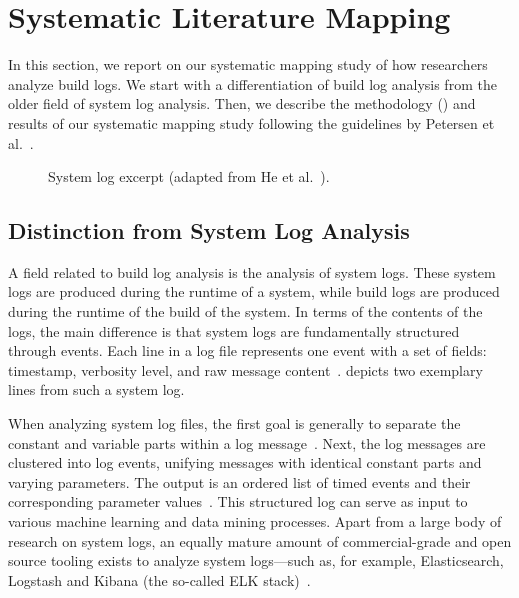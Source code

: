 \section{Systematic Literature Mapping}
\label{sec:mapping}

In this section, we report on our systematic mapping study of how
researchers analyze build logs.
We start with a differentiation of build log analysis
from the older field of system log analysis.
Then, we describe the methodology ()
and results of our systematic mapping study following the
guidelines by Petersen et
al.~\citep{petersen2008systematic,petersen2015guidelines}.

\begin{figure}[b]
  \centering
  
  \caption{System log excerpt (adapted from He et
  al.~\citep{he2017towards}).}
  \label{lst:system-log}
\end{figure}

\subsection{Distinction from System Log Analysis}
\label{sec:system-log-analysis}

A field related to build log analysis is the analysis of system logs.
These system logs are produced during the runtime of a system, while
build logs are produced during the runtime of the build of the system.
In terms of the contents of the logs, the main difference is that system
logs are fundamentally structured
through events.
Each line in a log file represents one event with a
set of fields: timestamp, verbosity level, and raw message
content~\citep{he2017towards}.
 depicts two
exemplary lines from such a system log.

When analyzing system log files, the first goal is generally to
separate the constant and variable parts within a log
message~\citep{nagappan2010abstracting,he2017towards}.
Next, the log
messages are clustered into log events, unifying messages with
identical constant parts and varying parameters.
The output is an
ordered list of timed events and their corresponding parameter
values~\citep{he2016evaluation}.
This structured log can serve as
input to various machine learning and data mining processes.
Apart
from a large body of research on system logs, an equally mature amount
of commercial-grade and
open source tooling exists to analyze system logs---such as, for
example, Elasticsearch, Logstash and Kibana (the so-called ELK
stack)~\citep{sanjappa2017analysis,bajer2017building}.

